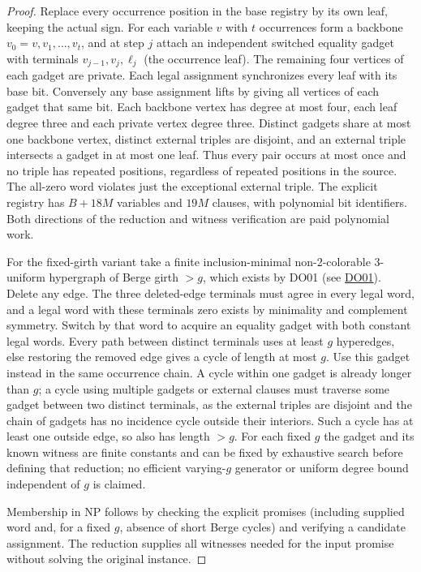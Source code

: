\documentclass[11pt]{article}
\begin{document}
\begin{proof}
Replace every occurrence position in the base registry by its own leaf, keeping the actual sign. For each variable $v$ with $t$ occurrences form a backbone $v_0=v,v_1,\ldots,v_t$, and at step $j$ attach an independent switched equality gadget with terminals $v_{j-1},v_j,\ell_j$ (the occurrence leaf). The remaining four vertices of each gadget are private. Each legal assignment synchronizes every leaf with its base bit. Conversely any base assignment lifts by giving all vertices of each gadget that same bit. Each backbone vertex has degree at most four, each leaf degree three and each private vertex degree three. Distinct gadgets share at most one backbone vertex, distinct external triples are disjoint, and an external triple intersects a gadget in at most one leaf. Thus every pair occurs at most once and no triple has repeated positions, regardless of repeated positions in the source. The all-zero word violates just the exceptional external triple. The explicit registry has $B+18M$ variables and $19M$ clauses, with polynomial bit identifiers. Both directions of the reduction and witness verification are paid polynomial work.

For the fixed-girth variant take a finite inclusion-minimal non-2-colorable 3-uniform hypergraph of Berge girth $>g$, which exists by DO01 (see \href{https://github.com/j15marti/pnp/commit/642829b64fbe938b3b7e02047e7272117f307031}{DO01}). Delete any edge. The three deleted-edge terminals must agree in every legal word, and a legal word with these terminals zero exists by minimality and complement symmetry. Switch by that word to acquire an equality gadget with both constant legal words. Every path between distinct terminals uses at least $g$ hyperedges, else restoring the removed edge gives a cycle of length at most $g$. Use this gadget instead in the same occurrence chain. A cycle within one gadget is already longer than $g$; a cycle using multiple gadgets or external clauses must traverse some gadget between two distinct terminals, as the external triples are disjoint and the chain of gadgets has no incidence cycle outside their interiors. Such a cycle has at least one outside edge, so also has length $>g$. For each fixed $g$ the gadget and its known witness are finite constants and can be fixed by exhaustive search before defining that reduction; no efficient varying-$g$ generator or uniform degree bound independent of $g$ is claimed.

Membership in NP follows by checking the explicit promises (including supplied word and, for a fixed $g$, absence of short Berge cycles) and verifying a candidate assignment. The reduction supplies all witnesses needed for the input promise without solving the original instance.
\end{proof}
\end{document}
